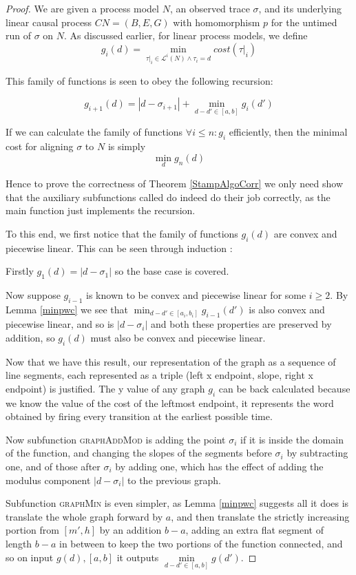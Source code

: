 \documentclass[conference]{IEEEtran}
\begin{document}
	\begin{proof}
		We are given a process model $N$, an observed trace $\sigma$, and its underlying linear causal process $CN = (B, E, G)$ with homomorphism $p$ for the untimed run of $\sigma$ on $N$.
		As discussed earlier, for linear process models, we define $$g_i(d) = \min_{\tau|_i \in \mathcal{L}^i(N) \wedge \tau_i = d} cost(\tau|_i)$$
		
		This family of functions is seen to obey the following recursion: 
		
		$$g_{i+1}(d) = |d - \sigma_{i+1}| + \min_{d-d' \in [a,b]} g_i(d')$$
		
		If we can calculate the family of functions $\forall i \leq n : g_i$ efficiently, then the minimal cost for aligning $\sigma$ to $N$ is simply $$\min_{d} g_n(d)$$
		
		Hence to prove the correctness of Theorem \ref{StampAlgoCorr} we only need show that the auxiliary subfunctions called do indeed do their job correctly, as the main function just implements the recursion. 
		
		To this end, we first notice that the family of functions $g_i(d)$ are convex and piecewise linear. 
		This can be seen through induction : 
		
		Firstly $g_1(d) = |d - \sigma_1|$ so the base case is covered. 
		
		Now suppose $g_{i-1}$ is known to be convex and piecewise linear for some $i \geq 2$. 
		By Lemma \ref{minpwc} we see that $\min_{d-d' \in [a_i,b_i]} g_{i-1}(d')$  is also convex and piecewise linear, and so is $|d - \sigma_i|$ and both these properties are preserved by addition, so $g_i(d)$ must also be convex and piecewise linear. 
		
		Now that we have this result, our representation of the graph as a sequence of line segments, each represented as a triple (left x endpoint, slope, right x endpoint) is justified. 
		The y value of any graph $g_i$ can be back calculated because we know the value of the cost of the leftmost endpoint, it represents the word obtained by firing every transition at the earliest possible time. 
		
		Now subfunction \textsc{graphAddMod} is adding the point $\sigma_i$ if it is inside the domain of the function, and changing the slopes of the segments before $\sigma_i$ by subtracting one, and of those after $\sigma_i$ by adding one, which has the effect of adding the modulus component $|d - \sigma_i|$ to the previous graph. 
		
		Subfunction \textsc{graphMin} is even simpler, as Lemma \ref{minpwc} suggests all it does is translate the whole graph forward by $a$, and then translate the strictly increasing portion from $[m', h]$ by an addition $b-a$, adding an extra flat segment of length $b-a$ in between to keep the two portions of the function connected, and so on input $g(d), [a, b]$ it outputs $\underset{d-d' \in [a,b]}{\min}g(d')$. 
		

\end{proof}
\end{document}
